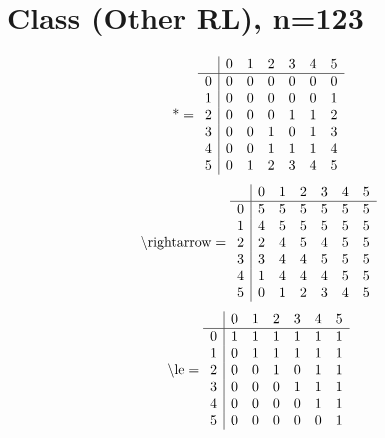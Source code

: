 \documentclass[11pt]{article}
\begin{document}
\section{Class (Other RL), n=123}
\[\text{*} = 
\begin{array}{r | r r r r r r}
 & 0 & 1 & 2 & 3 & 4 & 5 \\ \hline
0 & 0 & 0 & 0 & 0 & 0 & 0 \\
1 & 0 & 0 & 0 & 0 & 0 & 1 \\
2 & 0 & 0 & 0 & 1 & 1 & 2 \\
3 & 0 & 0 & 1 & 0 & 1 & 3 \\
4 & 0 & 0 & 1 & 1 & 1 & 4 \\
5 & 0 & 1 & 2 & 3 & 4 & 5 \\
\end{array}
\]
\[\text{\textbackslash rightarrow} = 
\begin{array}{r | r r r r r r}
 & 0 & 1 & 2 & 3 & 4 & 5 \\ \hline
0 & 5 & 5 & 5 & 5 & 5 & 5 \\
1 & 4 & 5 & 5 & 5 & 5 & 5 \\
2 & 2 & 4 & 5 & 4 & 5 & 5 \\
3 & 3 & 4 & 4 & 5 & 5 & 5 \\
4 & 1 & 4 & 4 & 4 & 5 & 5 \\
5 & 0 & 1 & 2 & 3 & 4 & 5 \\
\end{array}
\]
\[\text{\textbackslash le} = 
\begin{array}{r | r r r r r r}
 & 0 & 1 & 2 & 3 & 4 & 5 \\ \hline
0 & 1 & 1 & 1 & 1 & 1 & 1 \\
1 & 0 & 1 & 1 & 1 & 1 & 1 \\
2 & 0 & 0 & 1 & 0 & 1 & 1 \\
3 & 0 & 0 & 0 & 1 & 1 & 1 \\
4 & 0 & 0 & 0 & 0 & 1 & 1 \\
5 & 0 & 0 & 0 & 0 & 0 & 1 \\
\end{array}
\]
\end{document}

